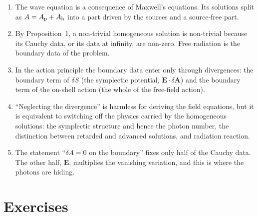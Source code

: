 \begin{enumerate}
\item The wave equation is a consequence of Maxwell's equations. Its
solutions split as $A=A_{\rm p}+A_{\rm h}$ into a part driven by the
sources and a source-free part.
\item By Proposition~1, a non-trivial homogeneous solution is
non-trivial because its Cauchy data, or its data at infinity, are
non-zero. Free radiation is the boundary data of the problem.
\item In the action principle the boundary data enter only through
divergences: the boundary term of $\delta S$ (the symplectic potential,
$\mathbf E\cdot\delta\mathbf A$) and the boundary term of the on-shell
action (the whole of the free-field action).
\item ``Neglecting the divergence'' is harmless for deriving the field
equations, but it is equivalent to switching off the physics carried by the
homogeneous solutions: the symplectic structure and hence the photon
number, the distinction between retarded and advanced solutions, and
radiation reaction.
\item The statement ``$\delta A=0$ on the boundary'' fixes only half of
the Cauchy data. The other half, $\mathbf E$, multiplies the vanishing
variation, and this is where the photons are hiding.
\end{enumerate}

\section*{Exercises}

